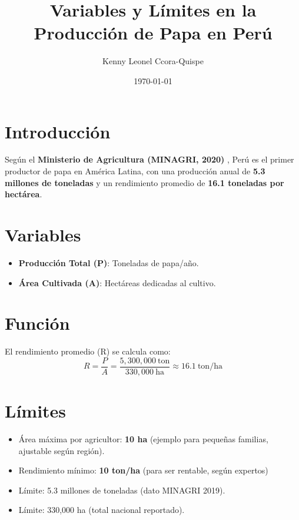 \documentclass{article}
\begin{document}
\title{Variables y Límites en la Producción de Papa en Perú}
\author{Kenny Leonel Ccora-Quispe}
\date{\today}
\maketitle

\section{Introducción}
Según el \textbf{Ministerio de Agricultura (MINAGRI, 2020)} \cite{minagri2020}, Perú es el primer productor de papa en América Latina, con una producción anual de \textbf{5.3 millones de toneladas} y un rendimiento promedio de \textbf{16.1 toneladas por hectárea}.

\section{Variables}
\begin{itemize}
    \item \textbf{Producción Total (P)}: Toneladas de papa/año.
    \item \textbf{Área Cultivada (A)}: Hectáreas dedicadas al cultivo.
\end{itemize}

\section{Función}
El rendimiento promedio (R) se calcula como:
\[
R = \frac{P}{A} = \frac{5,300,000\ \text{ton}}{330,000\ \text{ha}} \approx 16.1\ \text{ton/ha}
\]

\section{Límites}
\begin{itemize}
    \item Área máxima por agricultor: \textbf{10 ha} (ejemplo para pequeñas familias, ajustable según región).
    \item Rendimiento mínimo: \textbf{10 ton/ha} (para ser rentable, según expertos)
    \item Límite: 5.3 millones de toneladas (dato MINAGRI 2019).
    \item Límite: 330,000 ha (total nacional reportado).
\end{itemize}
\end{document}

